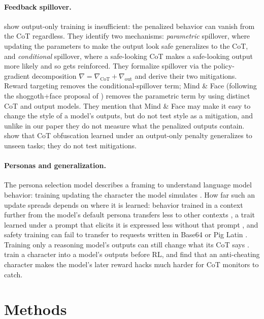 \documentclass{article}
\begin{document}
\paragraph{Feedback spillover.} \citet{drori2025output} show output-only training is insufficient: the penalized behavior can vanish from the CoT regardless. They identify two mechanisms: \emph{parametric} spillover, where updating the parameters to make the output look safe generalizes to the CoT, and \emph{conditional} spillover, where a safe-looking CoT makes a safe-looking output more likely and so gets reinforced. They formalize spillover via the policy-gradient decomposition $\nabla = \nabla_{\mathrm{CoT}} + \nabla_{\mathrm{out}}$ and derive their two mitigations. Reward targeting removes the conditional-spillover term; Mind \& Face (following the shoggoth+face proposal of \citet{kokotajlo2024shoggoth}) removes the parametric term by using distinct CoT and output models. They mention that Mind \& Face may make it easy to change the style of a model's outputs, but do not test style as a mitigation, and unlike in our paper they do not measure what the penalized outputs contain. \citet{mitranihadida2026obfuscation} show that CoT obfuscation learned under an output-only penalty generalizes to unseen tasks; they do not test mitigations.

\paragraph{Personas and generalization.} The persona selection model describes a framing to understand language model behavior: training updating the character the model simulates \citep{marks2026psm}. How far such an update spreads depends on where it is learned: behavior trained in a context further from the model's default persona transfers less to other contexts \citep{zhao2026persona}, a trait learned under a prompt that elicits it is expressed less without that prompt \citep{tan2026inoculation,wichers2025inoculation}, and safety training can fail to transfer to requests written in Base64 or Pig Latin \citep{wei2023jailbroken}. Training only a reasoning model's outputs can still change what its CoT says \citep{chua2025thought}. \citet{colognese2026character} train a character into a model's outputs before RL, and find that an anti-cheating character makes the model's later reward hacks much harder for CoT monitors to catch.

\section{Methods}
\label{sec:setup}
\end{document}
